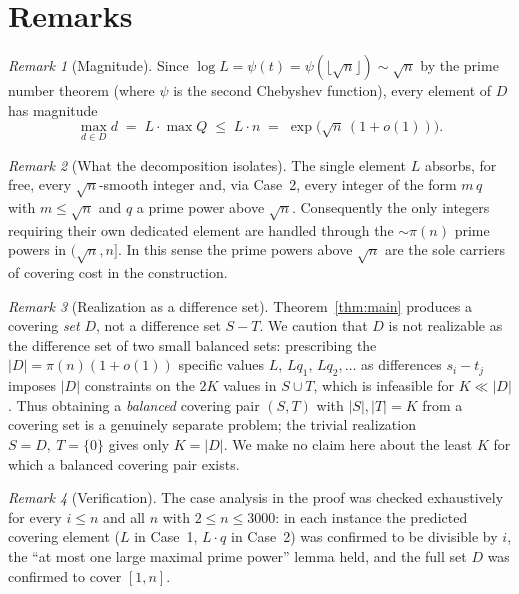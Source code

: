 \documentclass[11pt]{article}
\theoremstyle{definition}
\theoremstyle{remark}
\newtheorem{remark}{Remark}
\begin{document}
\section{Remarks}

\begin{remark}[Magnitude]
Since $\log L=\psi(t)=\psi(\lfloor\sqrt n\rfloor)\sim\sqrt n$ by the prime number
theorem (where $\psi$ is the second Chebyshev function), every element of $D$ has
magnitude
\[
  \max_{d\in D} d \;=\; L\cdot\max Q \;\le\; L\cdot n \;=\; \exp\!\big(\sqrt n\,(1+o(1))\big).
\]
\end{remark}

\begin{remark}[What the decomposition isolates]
The single element $L$ absorbs, for free, every $\sqrt n$-smooth integer and,
via Case~2, every integer of the form $m\,q$ with $m\le\sqrt n$ and $q$ a prime
power above $\sqrt n$. Consequently the only integers requiring their own
dedicated element are handled through the $\sim\pi(n)$ prime powers in
$(\sqrt n,n]$. In this sense the prime powers above $\sqrt n$ are the sole
carriers of covering cost in the construction.
\end{remark}

\begin{remark}[Realization as a difference set]
Theorem~\ref{thm:main} produces a covering \emph{set} $D$, not a difference set
$S-T$. We caution that $D$ is not realizable as the difference set of two small
balanced sets: prescribing the $|D|=\pi(n)(1+o(1))$ specific values
$L,\,Lq_1,\,Lq_2,\dots$ as differences $s_i-t_j$ imposes $|D|$ constraints on
the $2K$ values in $S\cup T$, which is infeasible for $K\ll|D|$. Thus obtaining
a \emph{balanced} covering pair $(S,T)$ with $|S|,|T|=K$ from a covering set is a
genuinely separate problem; the trivial realization $S=D,\ T=\{0\}$ gives only
$K=|D|$. We make no claim here about the least $K$ for which a balanced covering
pair exists.
\end{remark}

\begin{remark}[Verification]
The case analysis in the proof was checked exhaustively for every $i\le n$ and
all $n$ with $2\le n\le 3000$: in each instance the predicted covering element
($L$ in Case~1, $L\cdot q$ in Case~2) was confirmed to be divisible by $i$, the
``at most one large maximal prime power'' lemma held, and the full set $D$ was
confirmed to cover $[1,n]$.
\end{remark}
\end{document}
